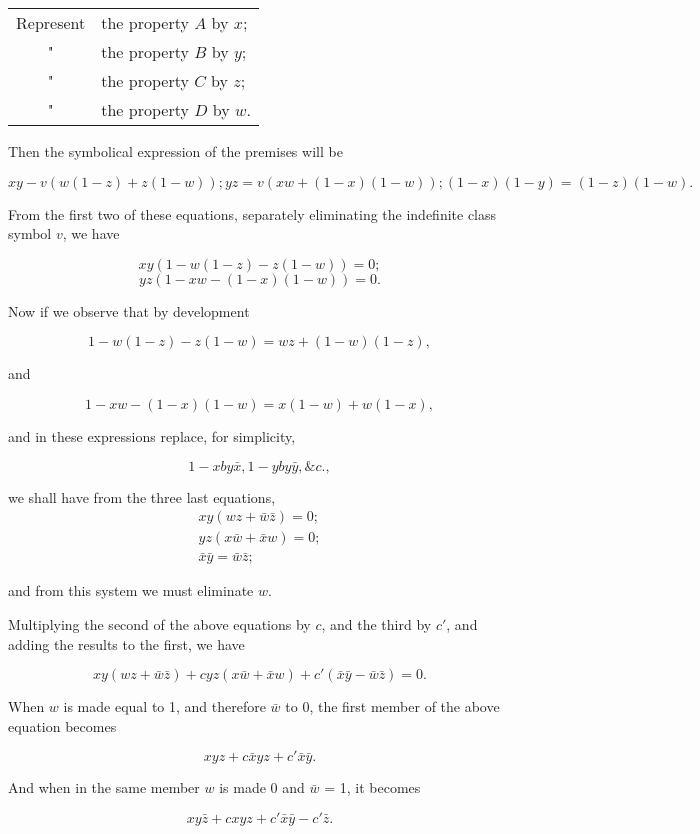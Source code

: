 \documentclass[oneside]{book}
\begin{document}
\begin{tabular}{c l}
Represent &the property $A$ by $x$; \\
     "    &the property $B$ by $y$; \\
     "    &the property $C$ by $z$; \\
     "    &the property $D$ by $w$.
\end{tabular}

Then the symbolical expression of the premises will be

\[
xy - v (w(1 - z) +z (1 - w));
yz = v (xw + (1 - x ) (1 - w));
(1-x)(1-y)=(1-z)(1-w).
\]

From the first two of these equations, separately eliminating the
indefinite class symbol $v$, we have

\[
xy (1 - w (1 - z) - z (1 - w)) = 0;
\]
\[
yz (1 - xw - (1 - x)(1 - w)) = 0.
\]

Now if we observe that by development

\[
1 - w(1 - z) - z(1 - w) = wz + (1 - w)(1 - z),
\]

and

\[
1 - xw - (1 - x) ( 1 - w) = x(1 - w) + w(1 - x),
\]


and in these expressions replace, for simplicity,

\[
1 - x by \bar{x}, 1 - y by \bar{y}, \&c.,
\]

we shall have from the three last equations,
\setcounter{equation}{0}
\begin{eqnarray}
xy (wz + \bar{w}\bar{z}) = 0; \\
yz (x\bar{w} + \bar{x}w) = 0; \\
\bar{x}\bar{y} = \bar{w}\bar{z};
\end{eqnarray}

and from this system we must eliminate $w$.

Multiplying the second of the above equations by $c$, and the
third by $c'$, and adding the results to the first, we have

\[
xy (wz + \bar{w}\bar{z}) + cyz (x\bar{w} + \bar{x}w) + c'(\bar{x}\bar{y} - \bar{w}\bar{z}) = 0.
\]

When $w$ is made equal to 1, and therefore $\bar{w}$ to 0, the first member
of the above equation becomes

\[
xyz + c\bar{x}yz + c'\bar{x}\bar{y}.
\]

And when in the same member $w$ is made 0 and $\bar{w}$ = 1, it becomes

\[
xy\bar{z} + cxyz + c'\bar{x}\bar{y} - c'\bar{z}.
\]
\end{document}
